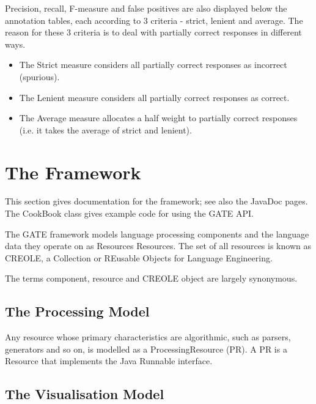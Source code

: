 Precision, recall, F-measure and
false positives are also displayed below the annotation tables, each
according to 3 criteria - strict, lenient and average. The reason for
these 3 criteria is to deal with partially correct responses in
different ways.
\begin{itemize}
\item The Strict measure considers all partially correct
responses as incorrect (spurious).
\item The Lenient measure considers all partially correct
responses as correct.
\item The Average measure allocates a half weight to
partially correct responses (i.e. it takes the average of strict and
lenient).
\end{itemize}


\section{The Framework}

\label{f0:the-framework}
This section gives documentation for the framework; see also the 
JavaDoc pages. 
The
CookBook class gives example code for
using the GATE API.

The GATE framework models language processing components and the language
data they operate on as Resources
Resources. The set of all resources is
known as CREOLE, a Collection or REusable Objects for Language Engineering.

The terms component, resource and CREOLE object are largely synonymous.

\subsection{The Processing Model}


Any resource whose primary characteristics are algorithmic, such as parsers,
generators and so on, is modelled as a 
ProcessingResource (PR).
A PR is a Resource that implements the Java Runnable interface.

\subsection{The Visualisation Model}


